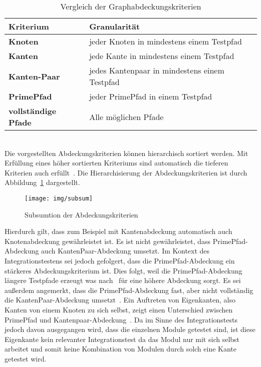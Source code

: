 \begin{center}
    \begin{table}[!ht]
        \begin{tabularx}{\textwidth}{|C|C|}
            \hline
            \textbf{Kriterium} & \textbf{Granularität}  \\
            \hline
            \textbf{Knoten} & jeder Knoten in mindestens einem Testpfad  \\
            \hline
            \textbf{Kanten} & jede Kante in mindestens einem Testpfad \\
            \hline
            \textbf{Kanten-Paar} & jedes Kantenpaar in mindestens einem Testpfad  \\
            \hline
            \textbf{PrimePfad} & jeder PrimePfad in einem Testpfad  \\
            \hline
            \textbf{vollständige Pfade} & Alle möglichen Pfade \\
            \hline
        \end{tabularx}
        \caption{Vergleich der Graphabdeckungskriterien}
    \end{table}
\end{center}
\\

Die vorgestellten Abdeckungskriterien können hierarchisch sortiert werden.
Mit Erfüllung eines höher sortierten Kriteriums sind automatisch die tieferen Kriterien auch erfüllt~\cite[vgl. Figure 2.15]{software-testing}.
Die Hierarchisierung der Abdeckungskriterien ist durch Abbildung~\ref{abdeckhier} dargestellt.

\begin{figure}[H]
    \centering
    \texttt{[image: img/subsum]}
    \caption{Subsumtion der Abdeckungskriterien}
    \label{abdeckhier}
\end{figure}

Hierdurch gilt, dass zum Beispiel mit Kantenabdeckung automatisch auch Knotenabdeckung gewährleistet ist.
Es ist nicht gewährleistet, dass PrimePfad-Abdeckung auch KantenPaar-Abdeckung umsetzt.
Im Kontext des Integrationstestens sei jedoch gefolgert, dass die PrimePfad-Abdeckung ein stärkeres Abdeckungskriterium ist.
Dies folgt, weil die PrimePfad-Abdeckung längere Testpfade erzeugt was nach~\cite[vgl. RQ 1]{property-based-testing} für eine höhere Abdeckung sorgt.
Es sei außerdem angemerkt, dass die PrimePfad-Abdeckung fast, aber nicht vollständig die KantenPaar-Abdeckung umsetzt~\cite[vgl. S. 20]{introductiontosoftwaretestingpptx}.
Ein Auftreten von Eigenkanten, also Kanten von einem Knoten zu sich selbst, zeigt einen Unterschied zwischen PrimePfad und Kantenpaar-Abdeckung~\cite[vgl. S. 21]{introductiontosoftwaretestingpptx}.
Da im Sinne des Integrationstests jedoch davon ausgegangen wird, dass die einzelnen Module getestet sind, ist diese Eigenkante kein relevanter Integrationstest da
das Modul nur mit sich selbst arbeitet und somit keine Kombination von Modulen durch solch eine Kante getestet wird.